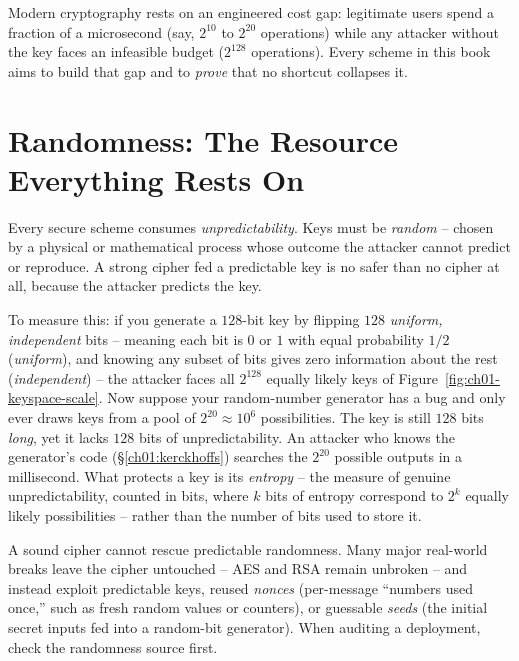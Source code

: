 \begin{focusbox}
Modern cryptography rests on an engineered cost gap: legitimate users spend a fraction of a microsecond (say, $2^{10}$ to $2^{20}$ operations) while any attacker without the key faces an infeasible budget ($2^{128}$ operations). Every scheme in this book aims to build that gap and to \emph{prove} that no shortcut collapses it.
\end{focusbox}

\section{Randomness: The Resource Everything Rests On}
\label{ch01:randomness}

Every secure scheme consumes \emph{unpredictability}. Keys must be \emph{random} -- chosen by a physical or mathematical process whose outcome the attacker cannot predict or reproduce. A strong cipher fed a predictable key is no safer than no cipher at all, because the attacker predicts the key.

To measure this: if you generate a $128$-bit key by flipping $128$ \emph{uniform, independent} bits -- meaning each bit is $0$ or $1$ with equal probability $1/2$ (\emph{uniform}), and knowing any subset of bits gives zero information about the rest (\emph{independent}) -- the attacker faces all $2^{128}$ equally likely keys of Figure~\ref{fig:ch01-keyspace-scale}. Now suppose your random-number generator has a bug and only ever draws keys from a pool of $2^{20} \approx 10^6$ possibilities. The key is still $128$ bits \emph{long}, yet it lacks $128$ bits of unpredictability. An attacker who knows the generator's code (\S\ref{ch01:kerckhoffs}) searches the $2^{20}$ possible outputs in a millisecond. What protects a key is its \emph{entropy} -- the measure of genuine unpredictability, counted in bits, where $k$ bits of entropy correspond to $2^k$ equally likely possibilities -- rather than the number of bits used to store it.

\begin{intuitionbox}
A sound cipher cannot rescue predictable randomness. Many major real-world breaks leave the cipher untouched -- AES and RSA remain unbroken -- and instead exploit predictable keys, reused \emph{nonces} (per-message ``numbers used once,'' such as fresh random values or counters), or guessable \emph{seeds} (the initial secret inputs fed into a random-bit generator). When auditing a deployment, check the randomness source first.
\end{intuitionbox}

